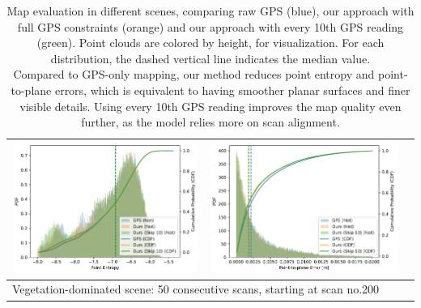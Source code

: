 \begin{table}[h]
{\begin{tabular}{ccc}
            \includegraphics[width=0.31\linewidth]{images/map_eval/entropy_gps_ours_skip-200--50.pdf}  &
            \includegraphics[width=0.31\linewidth]{images/map_eval/p2plane_gps_ours_skip-200--50.pdf}                                                  \\
            \hline
            \multicolumn{3}{l}{Vegetation-dominated scene: 50 consecutive scans, starting at scan no.200}                                              \\
            \hline
        \end{tabular}
    }

    \caption{Map evaluation in different scenes, comparing raw GPS (blue), our approach with full GPS constraints (orange) and our approach with every 10th GPS reading (green). Point clouds are colored by height, for visualization. For each distribution, the dashed vertical line indicates the median value.\\Compared to GPS-only mapping, our method reduces point entropy and point-to-plane errors, which is equivalent to having smoother planar surfaces and finer visible details. Using every 10th GPS reading improves the map quality even further, as the model relies more on scan alignment.}
    \label{tab:map-eval}
\end{table}


